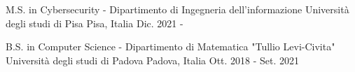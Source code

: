 
\begin{cventries}


  \cvstudyentry
  {M.S. in Cybersecurity - Dipartimento di Ingegneria dell'informazione} %
  {Università degli studi di Pisa} %
  {Pisa, Italia} %
  {Dic. 2021 - } %
  {
  }
  
  \cvstudyentry
  {B.S. in Computer Science - Dipartimento di Matematica "Tullio Levi-Civita"} %
  {Università degli studi di Padova} %
  {Padova, Italia} %
  {Ott. 2018 - Set. 2021} %
  {
  }

\end{cventries}
